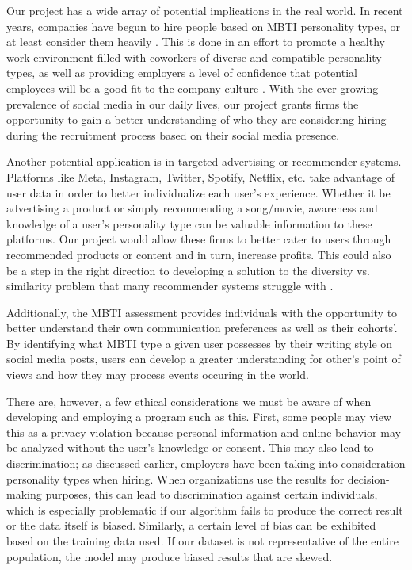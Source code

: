 \documentclass{article}
\begin{document}
Our project has a wide array of potential implications in the real world. In recent years, companies have begun to hire people based on MBTI personality types, or at least consider them heavily \cite{nguyen18}. This is done in an effort to promote a healthy work environment filled with coworkers of diverse and compatible personality types, as well as providing employers a level of confidence that potential employees will be a good fit to the company culture \cite{nguyen18}. With the ever-growing prevalence of social media in our daily lives, our project grants firms the opportunity to gain a better understanding of who they are considering hiring during the recruitment process based on their social media presence.

Another potential application is in targeted advertising or recommender systems. Platforms like Meta, Instagram, Twitter, Spotify, Netflix, etc. take advantage of user data in order to better individualize each user’s experience. Whether it be advertising a product or simply recommending a song/movie, awareness and knowledge of a user’s personality type can be valuable information to these platforms. Our project would allow these firms to better cater to users through recommended products or content and in turn, increase profits. This could also be a step in the right direction to developing a solution to the diversity vs. similarity problem that many recommender systems struggle with \cite{solving23}.

Additionally, the MBTI assessment provides individuals with the opportunity to better understand their own communication preferences as well as their cohorts’. By identifying what MBTI type a given user possesses by their writing style on social media posts, users can develop a greater understanding for other’s point of views and how they may process events occuring in the world.

There are, however, a few ethical considerations we must be aware of when developing and employing a program such as this. First, some people may view this as a privacy violation because  personal information and online behavior may be analyzed without the user’s knowledge or consent. This may also lead to discrimination; as discussed earlier, employers have been taking into consideration personality types when hiring. When organizations use the results for decision-making purposes, this can lead to discrimination against certain individuals, which is especially problematic if our algorithm fails to produce the correct result or the data itself is biased. Similarly, a certain level of bias can be exhibited based on the training data used. If our dataset is not representative of the entire population, the model may produce biased results that are skewed.
\end{document}
